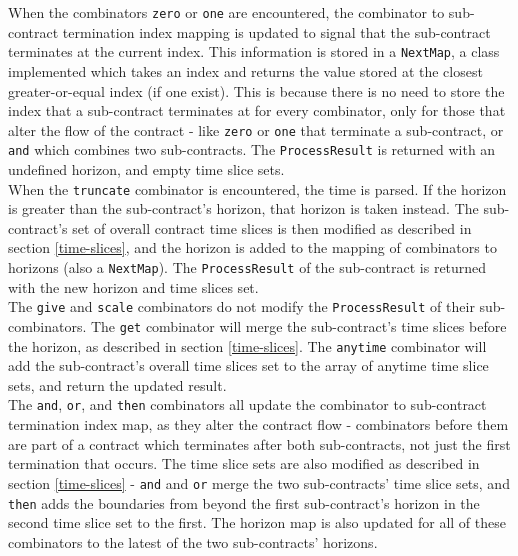 When the combinators \texttt{zero} or \texttt{one} are encountered, the combinator to sub-contract termination index mapping is updated to signal that the sub-contract terminates at the current index. This information is stored in a \texttt{NextMap}, a class implemented which takes an index and returns the value stored at the closest greater-or-equal index (if one exist). This is because there is no need to store the index that a sub-contract terminates at for every combinator, only for those that alter the flow of the contract - like \texttt{zero} or \texttt{one} that terminate a sub-contract, or \texttt{and} which combines two sub-contracts. The \texttt{ProcessResult} is returned with an undefined horizon, and empty time slice sets. \\

When the \texttt{truncate} combinator is encountered, the time is parsed. If the horizon is greater than the sub-contract's horizon, that horizon is taken instead. The sub-contract's set of overall contract time slices is then modified as described in section \ref{time-slices}, and the horizon is added to the mapping of combinators to horizons (also a \texttt{NextMap}). The \texttt{ProcessResult} of the sub-contract is returned with the new horizon and time slices set. \\

The \texttt{give} and \texttt{scale} combinators do not modify the \texttt{ProcessResult} of their sub-combinators. The \texttt{get} combinator will merge the sub-contract's time slices before the horizon, as described in section \ref{time-slices}. The \texttt{anytime} combinator will add the sub-contract's overall time slices set to the array of anytime time slice sets, and return the updated result. \\

The \texttt{and}, \texttt{or}, and \texttt{then} combinators all update the combinator to sub-contract termination index map, as they alter the contract flow - combinators before them are part of a contract which terminates after both sub-contracts, not just the first termination that occurs. The time slice sets are also modified as described in section \ref{time-slices} - \texttt{and} and \texttt{or} merge the two sub-contracts' time slice sets, and \texttt{then} adds the boundaries from beyond the first sub-contract's horizon in the second time slice set to the first. The horizon map is also updated for all of these combinators to the latest of the two sub-contracts' horizons. \\

